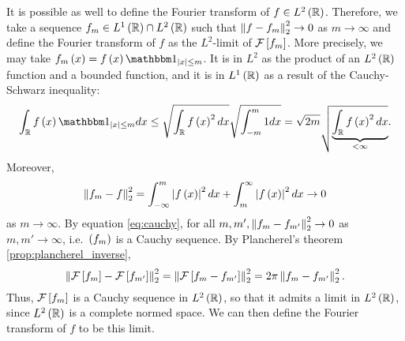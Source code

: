 \begin{remark}\label{rem:fourier_l2}
	It is possible as well to define the Fourier transform of $f\in L^2\left(\mathbb{R}\right)$. Therefore, we take a sequence $f_m \in L^1\left(\mathbb{R}\right)\cap L^2\left(\mathbb{R}\right)$ such that $\left\| f-f_m \right\|^2_2\rightarrow 0$ as $m\rightarrow \infty$ and define the Fourier transform of $f$ as the $L^2$-limit of $\mathcal{F} \left[f_m\right]$. More precisely, we may take $f_m\pa{x} = f\pa{x} \one_{\abs{x}\leq m}$. It is in $L^2$ as the product of an $L^2\left(\mathbb{R}\right)$ function and a bounded function, and it is in $L^1\left(\mathbb{R}\right)$ as a result of the Cauchy-Schwarz inequality:
	\begin{equation*}
		\int_{\R} f\pa{x} \one_{\abs{x}\leq m} dx \leq \sqrt{\int_{\R} f\pa{x}^2 dx } \sqrt{\int_{-m}^m 1 dx } = \sqrt{2m}  \sqrt{\underbrace{\int_{\R} f\pa{x}^2 dx}_{<\infty} }.
	\end{equation*}
	Moreover,
	\begin{equation}\label{eq:cauchy}
		\left\| f_m -f \right\|^2_2 = \int_{-\infty}^m \left| f\left(x\right)\right|^2 dx + \int_m^\infty \left| f\left(x\right)\right|^2 dx \rightarrow 0
	\end{equation}
	as $m\rightarrow \infty$.
	By equation \ref{eq:cauchy}, for all $m,m', \left\| f_m -f_{m'} \right\|_2^2\rightarrow
		0$ as $m,m'\rightarrow \infty$, i.e.~$\left(f_m\right)$ is a Cauchy sequence. By
	Plancherel's theorem \ref{prop:plancherel_inverse},
	\begin{equation*}
		\left\| \mathcal{F} \left[f_m\right] -\mathcal{F}\left[f_{m'}\right]  \right\|_2^2 = \left\| \mathcal{F} \left[f_m -f_{m'} \right] \right\|_2^2 = 2\pi \left\| f_m -f_{m'} \right\|_2^2.
	\end{equation*}
	Thus, $\mathcal{F}\left[f_m\right]$ is a Cauchy sequence in $L^2\left(\mathbb{R}\right)$, so that it admits a limit in $L^2\left(\mathbb{R}\right)$, since $L^2\left(\mathbb{R}\right)$ is a complete normed space. We can then define the Fourier transform of $f$ to be this limit.
\end{remark}

